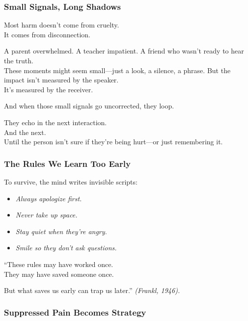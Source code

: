 \subsubsection{\texorpdfstring{\textbf{Small Signals, Long
Shadows}}{Small Signals, Long Shadows}}\label{small-signals-long-shadows}

Most harm doesn't come from cruelty.\\
It comes from disconnection.

A parent overwhelmed. A teacher impatient. A friend who wasn't ready to
hear the truth.\\
These moments might seem small---just a look, a silence, a phrase. But
the impact isn't measured by the speaker.\\
It's measured by the receiver.

And when those small signals go uncorrected, they loop.

They echo in the next interaction.\\
And the next.\\
Until the person isn't sure if they're being hurt---or just remembering
it.

\subsubsection{\texorpdfstring{\textbf{The Rules We Learn Too
Early}}{The Rules We Learn Too Early}}\label{the-rules-we-learn-too-early}

To survive, the mind writes invisible scripts:

\begin{itemize}
\item
  \emph{Always apologize first.\\
  }
\item
  \emph{Never take up space.\\
  }
\item
  \emph{Stay quiet when they're angry.\\
  }
\item
  \emph{Smile so they don't ask questions.\\
  }
\end{itemize}

``These rules may have worked once.\\
They may have saved someone once.

But what saves us early can trap us later.'' \emph{(Frankl, 1946).}

\subsubsection{\texorpdfstring{\textbf{Suppressed Pain Becomes
Strategy}}{Suppressed Pain Becomes Strategy}}\label{suppressed-pain-becomes-strategy}

